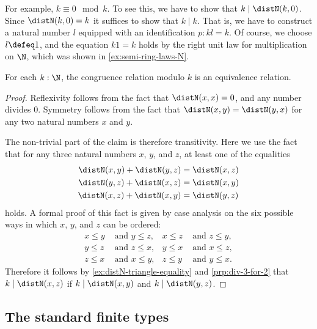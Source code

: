 \begin{eg}
  For example, $k\equiv 0\mod k$. To see this, we have to show that $k\mid\distN(k,0)$. Since $\distN(k,0)=k$ it suffices to show that $k\mid k$. That is, we have to construct a natural number $l$ equipped with an identification $p:kl=k$. Of course, we choose $l\defeq 1$, and the equation $k1=k$ holds by the right unit law for multiplication on $\N$, which was shown in \cref{ex:semi-ring-laws-N}.
\end{eg}

\begin{prp}\label{prp:congruence-eqrel}
  For each $k:\N$, the congruence relation modulo $k$ is an equivalence relation.
\end{prp}

\begin{proof}
  Reflexivity follows from the fact that $\distN(x,x)=0$, and any number divides $0$. Symmetry follows from the fact that $\distN(x,y)=\distN(y,x)$ for any two natural numbers $x$ and $y$.

  The non-trivial part of the claim is therefore transitivity. Here we use the fact that for any three natural numbers $x$, $y$, and $z$, at least one of the equalities
  \begin{align*}
    \distN(x,y)+\distN(y,z) & =\distN(x,z) \\
    \distN(y,z)+\distN(x,z) & =\distN(x,y) \\
    \distN(x,z)+\distN(x,y) & =\distN(y,z)
  \end{align*}
  holds. A formal proof of this fact is given by case analysis on the six possible ways in which $x$, $y$, and $z$ can be ordered:
  \begin{align*}
    x\leq y & \text{ and }y\leq z, & x\leq z & \text{ and }z\leq y, \\
    y\leq z & \text{ and }z\leq x, & y\leq x & \text{ and }x\leq z, \\
    z\leq x & \text{ and }x\leq y, & z\leq y & \text{ and }y\leq x.
  \end{align*}
  Therefore it follows by \cref{ex:distN-triangle-equality} and \cref{prp:div-3-for-2} that ${k\mid\distN(x,z)}$ if ${k\mid\distN(x,y)}$ and ${k\mid\distN(y,z)}$.
\end{proof}

\subsection{The standard finite types}\label{sec:Fin}


